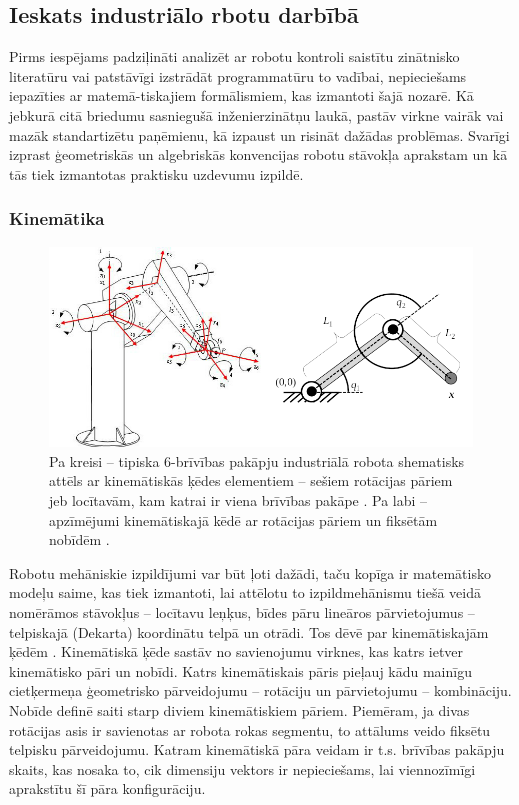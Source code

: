 \documentclass[12pt, a4paper]{article}
\numberwithin{equation}{section} %
\begin{document}
\subsection{Ieskats industriālo rbotu darbībā}

Pirms iespējams padziļināti analizēt ar robotu kontroli saistītu zinātnisko literatūru vai patstāvīgi izstrādāt programmatūru to vadībai, nepieciešams iepazīties ar matemā-tiskajiem formālismiem, kas izmantoti šajā nozarē. Kā jebkurā citā briedumu sasniegušā inženierzinātņu laukā, pastāv virkne vairāk vai mazāk standartizētu paņēmienu, kā izpaust un risināt dažādas problēmas. Svarīgi izprast ģeometriskās un algebriskās konvencijas robotu stāvokļa aprakstam un kā tās tiek izmantotas praktisku uzdevumu izpildē.

\subsubsection{Kinemātika}

\begin{figure}[t!]
    \centering
    \includegraphics[width=16cm,page=1]{../img/6dof-kinematics.png}
    \caption{Pa kreisi -- tipiska 6-brīvības pakāpju industriālā robota shematisks attēls ar kinemātiskās ķēdes elementiem -- sešiem rotācijas pāriem jeb locītavām, kam katrai ir viena brīvības pakāpe \cite{harib2012parallel}. Pa labi -- apzīmējumi kinemātiskajā kēdē ar rotācijas pāriem un fiksētām nobīdēm \cite{kinematics_illinois}.}
\end{figure}

Robotu mehāniskie izpildījumi var būt ļoti dažādi, taču kopīga ir matemātisko modeļu saime, kas tiek izmantoti, lai attēlotu to izpildmehānismu tiešā veidā nomērāmos stāvokļus -- locītavu leņķus, bīdes pāru lineāros pārvietojumus -- telpiskajā (Dekarta) koordinātu telpā un otrādi. Tos dēvē par kinemātiskajām ķēdēm \cite{kinematics_illinois}. Kinemātiskā ķēde sastāv no savienojumu virknes, kas katrs ietver kinemātisko pāri un nobīdi. Katrs kinemātiskais pāris pieļauj kādu mainīgu cietķermeņa ģeometrisko pārveidojumu -- rotāciju un pārvietojumu -- kombināciju. Nobīde definē saiti starp diviem kinemātiskiem pāriem. Piemēram, ja divas rotācijas asis ir savienotas ar robota rokas segmentu, to attālums veido fiksētu telpisku pārveidojumu. Katram kinemātiskā pāra veidam ir t.s. brīvības pakāpju skaits, kas nosaka to, cik dimensiju vektors ir nepieciešams, lai viennozīmīgi aprakstītu šī pāra konfigurāciju.
\end{document}
